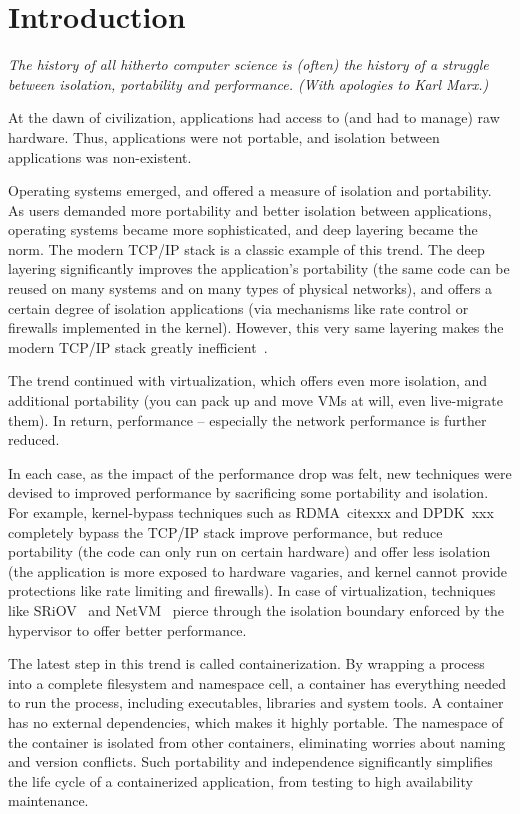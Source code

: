 \section{Introduction} 
\label{sec:introduction}

{\em 
The history of all hitherto computer science is (often) the history of a
struggle between isolation, portability and performance. (With apologies to Karl
Marx.)}

At the dawn of civilization, applications had access to (and had to manage) raw
hardware. Thus, applications were not portable, and isolation between
applications was non-existent.

Operating systems emerged, and offered a measure of isolation and portability.
As users demanded more portability and better isolation between applications,
operating systems became more sophisticated, and deep layering became the norm.
The modern TCP/IP stack is a classic example of this trend. The deep layering
significantly improves the application's portability (the same code can be reused
on many systems and on many types of physical networks), and offers a certain
degree of isolation applications (via mechanisms like rate control or firewalls
implemented in the kernel). 
However, this very same layering makes the modern TCP/IP stack greatly
inefficient~\cite{dcqcn,luigipapers}.   

The trend continued with virtualization, which offers even more isolation, and
additional portability (you can pack up and move VMs at will, even live-migrate
them). In return, performance -- especially the network performance is further
reduced.

In each case, as the impact of the performance drop was felt, new techniques
were devised to improved performance by sacrificing some portability and
isolation.  For example, kernel-bypass techniques such as RDMA~cite{xxx} and
DPDK~{xxx} completely bypass the TCP/IP stack improve performance, but reduce
portability (the code can only run on certain hardware) and offer less isolation
(the application is more exposed to hardware vagaries, and kernel cannot provide
protections like rate limiting and firewalls). In case of virtualization,
techniques like SRiOV~\cite{xxx} and NetVM~\cite{netvm} pierce through the
isolation boundary enforced by the hypervisor to offer better performance. 

The latest step in this trend is called containerization.  By wrapping a process
into a complete filesystem and namespace cell, a container has everything needed
to run the process, including executables, libraries and system tools.  A
container has no external dependencies, which makes it highly portable. The
namespace of the container is isolated from other containers, eliminating
worries about naming and version conflicts.  Such portability and independence
significantly simplifies the life cycle of a containerized application, from
testing to high availability maintenance.  

